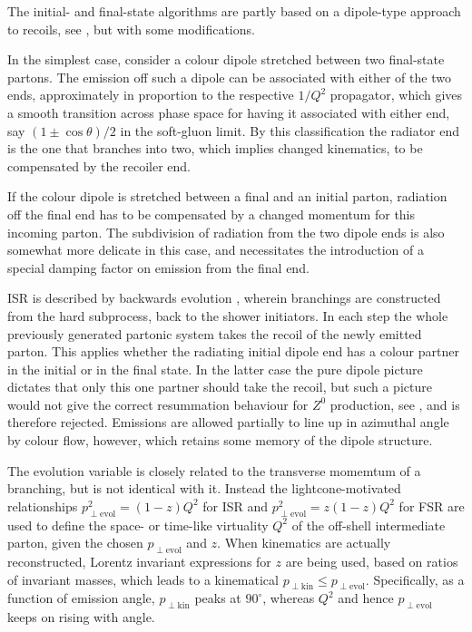 \mcsubsection{\gensectionshower}

The initial- and final-state algorithms are partly based on a 
dipole-type approach to recoils, see , but with 
some modifications. 

In the simplest case, consider a colour dipole stretched between 
two final-state partons. The emission off such a dipole can be 
associated with either of the two ends, approximately in proportion 
to the respective $1/Q^2$ propagator, which gives a smooth transition 
across phase space for having it associated with either end, 
say $(1 \pm \cos\theta)/2$ in the soft-gluon limit.
By this classification the radiator end is the one that branches 
into two, which implies changed kinematics, to be compensated by 
the recoiler end. 

If the colour dipole is stretched between a final and an initial 
parton, radiation off  the final end has to be compensated by a 
changed momentum for this incoming parton. The subdivision of 
radiation from the two dipole ends is also somewhat more delicate 
in this case, and necessitates the introduction of a special damping 
factor on emission from the final end. 
 
ISR is described by backwards evolution \cite{Sjostrand:1985xi}, 
wherein branchings are constructed from the hard subprocess, back to 
the shower initiators. In each step the whole previously generated
partonic system takes the recoil of the newly emitted parton.
This applies whether the radiating initial dipole end has a 
colour partner in the initial or in the final state. In the latter 
case the pure dipole picture dictates that only this one partner
should take the recoil, but such a picture would not give the correct 
resummation behaviour \eg for $Z^0$ production, see ,  
and is therefore rejected. Emissions are allowed partially to line up 
in azimuthal angle by colour flow, however, which retains some memory 
of the dipole structure.

The evolution variable is closely related to the transverse momemtum
of a branching, but is not identical with it. Instead the 
lightcone-motivated relationships $p_{\perp\mathrm{evol}}^2 = (1-z)Q^2$ 
for ISR and $p_{\perp\mathrm{evol}}^2 = z(1-z)Q^2$ for FSR are used to 
define the space- or time-like virtuality $Q^2$ of the off-shell 
intermediate parton, given the chosen $p_{\perp\mathrm{evol}}$ 
and $z$. When kinematics are actually reconstructed, Lorentz
invariant expressions for $z$ are being used, based on ratios of 
invariant masses, which leads to a kinematical 
$p_{\perp\mathrm{kin}} \leq p_{\perp\mathrm{evol}}$.
Specifically, as a function of emission angle, $p_{\perp\mathrm{kin}}$
peaks at $90^{\circ}$, whereas $Q^2$ and hence $p_{\perp\mathrm{evol}}$ 
keeps on rising with angle.

